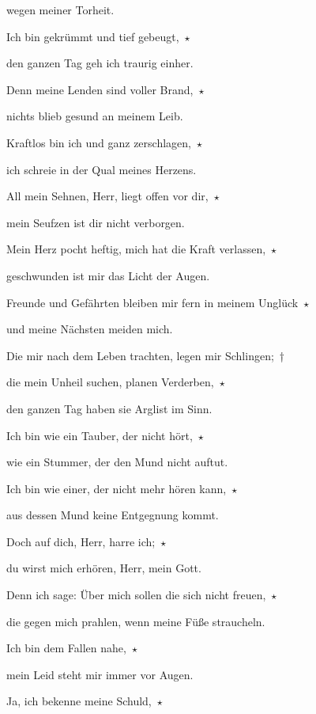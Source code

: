 wegen meiner Torheit.
 
\noindent Ich bin gekrümmt und tief gebeugt,~$\star$~\nopagebreak

den ganzen Tag geh ich traurig einher.
 
\noindent Denn meine Lenden sind voller Brand,~$\star$~\nopagebreak

nichts blieb gesund an meinem Leib.
 
\noindent Kraftlos bin ich und ganz zerschlagen,~$\star$~\nopagebreak

ich schreie in der Qual meines Herzens.
 
\noindent All mein Sehnen, Herr, liegt offen vor dir,~$\star$~\nopagebreak

mein Seufzen ist dir nicht verborgen.
 
\noindent Mein Herz pocht heftig, mich hat die Kraft verlassen,~$\star$~\nopagebreak

geschwunden ist mir das Licht der Augen.
 
\noindent Freunde und Gefährten bleiben mir fern in meinem Unglück~$\star$~\nopagebreak

und meine Nächsten meiden mich.
 
\noindent Die mir nach dem Leben trachten, legen mir Schlingen;~†~\nopagebreak

die mein Unheil suchen, planen Verderben,~$\star$~\nopagebreak

den ganzen Tag haben sie Arglist im Sinn.
 
\noindent Ich bin wie ein Tauber, der nicht hört,~$\star$~\nopagebreak

wie ein Stummer, der den Mund nicht auftut.
 
\noindent Ich bin wie einer, der nicht mehr hören kann,~$\star$~\nopagebreak

aus dessen Mund keine Entgegnung kommt.
 
\noindent Doch auf dich, Herr, harre ich;~$\star$~\nopagebreak

du wirst mich erhören, Herr, mein Gott.
 
\noindent Denn ich sage: Über mich sollen die sich nicht freuen,~$\star$~\nopagebreak

die gegen mich prahlen, wenn meine Füße straucheln.
 
\noindent Ich bin dem Fallen nahe,~$\star$~\nopagebreak

mein Leid steht mir immer vor Augen.
 
\noindent Ja, ich bekenne meine Schuld,~$\star$~\nopagebreak

